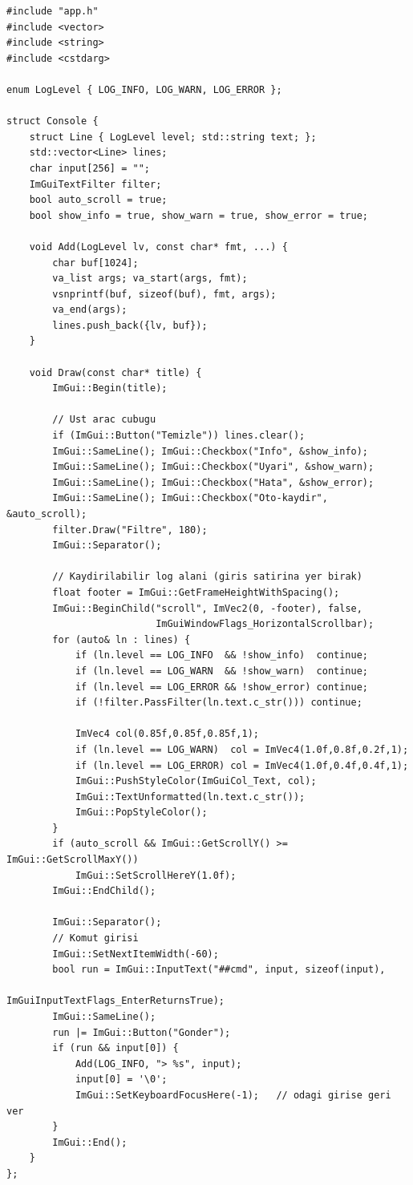\documentclass[11pt,a4paper]{article}
\begin{document}
\begin{lstlisting}
#include "app.h"
#include <vector>
#include <string>
#include <cstdarg>

enum LogLevel { LOG_INFO, LOG_WARN, LOG_ERROR };

struct Console {
    struct Line { LogLevel level; std::string text; };
    std::vector<Line> lines;
    char input[256] = "";
    ImGuiTextFilter filter;
    bool auto_scroll = true;
    bool show_info = true, show_warn = true, show_error = true;

    void Add(LogLevel lv, const char* fmt, ...) {
        char buf[1024];
        va_list args; va_start(args, fmt);
        vsnprintf(buf, sizeof(buf), fmt, args);
        va_end(args);
        lines.push_back({lv, buf});
    }

    void Draw(const char* title) {
        ImGui::Begin(title);

        // Ust arac cubugu
        if (ImGui::Button("Temizle")) lines.clear();
        ImGui::SameLine(); ImGui::Checkbox("Info", &show_info);
        ImGui::SameLine(); ImGui::Checkbox("Uyari", &show_warn);
        ImGui::SameLine(); ImGui::Checkbox("Hata", &show_error);
        ImGui::SameLine(); ImGui::Checkbox("Oto-kaydir", &auto_scroll);
        filter.Draw("Filtre", 180);
        ImGui::Separator();

        // Kaydirilabilir log alani (giris satirina yer birak)
        float footer = ImGui::GetFrameHeightWithSpacing();
        ImGui::BeginChild("scroll", ImVec2(0, -footer), false,
                          ImGuiWindowFlags_HorizontalScrollbar);
        for (auto& ln : lines) {
            if (ln.level == LOG_INFO  && !show_info)  continue;
            if (ln.level == LOG_WARN  && !show_warn)  continue;
            if (ln.level == LOG_ERROR && !show_error) continue;
            if (!filter.PassFilter(ln.text.c_str())) continue;

            ImVec4 col(0.85f,0.85f,0.85f,1);
            if (ln.level == LOG_WARN)  col = ImVec4(1.0f,0.8f,0.2f,1);
            if (ln.level == LOG_ERROR) col = ImVec4(1.0f,0.4f,0.4f,1);
            ImGui::PushStyleColor(ImGuiCol_Text, col);
            ImGui::TextUnformatted(ln.text.c_str());
            ImGui::PopStyleColor();
        }
        if (auto_scroll && ImGui::GetScrollY() >= ImGui::GetScrollMaxY())
            ImGui::SetScrollHereY(1.0f);
        ImGui::EndChild();

        ImGui::Separator();
        // Komut girisi
        ImGui::SetNextItemWidth(-60);
        bool run = ImGui::InputText("##cmd", input, sizeof(input),
                                    ImGuiInputTextFlags_EnterReturnsTrue);
        ImGui::SameLine();
        run |= ImGui::Button("Gonder");
        if (run && input[0]) {
            Add(LOG_INFO, "> %s", input);
            input[0] = '\0';
            ImGui::SetKeyboardFocusHere(-1);   // odagi girise geri ver
        }
        ImGui::End();
    }
};


\end{lstlisting}
\end{document}
